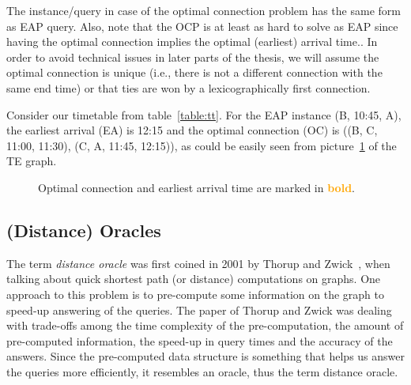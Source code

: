 	\noindent The instance/query in case of the optimal connection problem has the same form as EAP query. Also, note that the OCP is at least as hard to solve as EAP since having the optimal connection implies the optimal (earliest) arrival time.. In order to avoid technical issues in later parts of the thesis, we will assume the optimal connection is unique (i.e., there is not a different connection with the same end time) or that ties are won by a lexicographically first connection. 
	
	\begin{example}
		Consider our timetable from table~\ref{table:tt}. For the EAP instance (B, 10:45, A), the earliest arrival (EA) is 12:15 and the optimal connection (OC) is ((B, C, 11:00, 11:30), (C, A, 11:45, 12:15)), as could be easily seen from picture~\ref{pic:ea} of the TE graph.
	\end{example}

	\begin{figure}[h!]
	    \begin{center}
	    \end{center}
    	\caption{\label{pic:ea} Optimal connection and earliest arrival time are marked in \textcolor{orange}{\textbf{bold}}.}
	\end{figure}
	
\subsection{(Distance) Oracles}

	The term \textit{distance oracle} was first coined in 2001 by Thorup and Zwick~\cite{apxdo05}, when talking about quick shortest path (or distance) computations on graphs. One approach to this problem is to pre-compute some information on the graph to speed-up answering of the queries. The paper of Thorup and Zwick was dealing with trade-offs among the time complexity of the pre-computation, the amount of pre-computed information, the speed-up in query times and the accuracy of the answers. Since the pre-computed data structure is something that helps us answer the queries more efficiently, it resembles an oracle, thus the term distance oracle.

